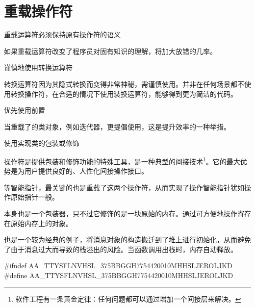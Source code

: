\section{重载操作符}

\begin{content}

\begin{regulation}
重载运算符必须保持原有操作符的语义
\end{regulation}

如果重载运算符改变了程序员对固有知识的理解，将加大放错的几率。

\begin{regulation}
谨慎地使用转换运算符
\end{regulation}

转换运算符因为其隐式转换而变得非常神秘，需谨慎使用。并非在任何场景都不使用转换操作符，在合适的情况下使用装换运算符，能够得到更为简洁的代码。

\begin{regulation}
优先使用前置
\end{regulation}

当重载了的类对象，例如迭代器，更提倡使用，这是提升效率的一种举措。

\begin{regulation}
使用实现类的包装或修饰
\end{regulation}

操作符是提供包装和修饰功能的特殊工具，是一种典型的间接技术\footnote{软件工程有一条黄金定律：任何问题都可以通过增加一个间接层来解决。}。它的最大优势是为用户提供良好的、人性化间接操作接口。

等智能指针，最关键的也是重载了这两个操作符，从而实现了操作智能指针犹如操作原始指针一般。

本身也是一个包装器，只不过它修饰的是一块原始的内存。通过可方便地操作寄存在原始内存上的对象。

也是一个较为经典的例子，将消息对象的构造搬迁到了堆上进行初始化，从而避免了由于消息过大而导致的栈溢出的风险。当函数调用出栈时，内存自动释放。

\begin{leftbar}
\begin{c++}[caption={base/AutoMsg.h}]
#ifndef AA_TTYSFLNVHSL_375BBGGH7754420010MHHSLJEROLJKD
#define AA_TTYSFLNVHSL_375BBGGH7754420010MHHSLJEROLJKD


\end{c++}
\end{leftbar}
\end{content}
